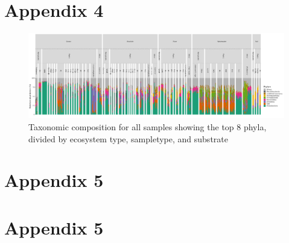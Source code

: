 \chapter{Appendix 4}
\label{appendix:tax}
\begin{figure}[h]
    \centering
    \includegraphics[width = 1.05\textheight, angle = 90]{figure/tax_phylum_ecosystem_sampletype_substrate.png}
    \caption{Taxonomic composition for all samples showing the top 8 phyla, divided by ecosystem type, sampletype, and substrate}
    \label{tax_plot_substrate_flip}
\end{figure}

\chapter{Appendix 5}
\label{appendix:top50amr}

\chapter{Appendix 5}
\label{appendix:code}

